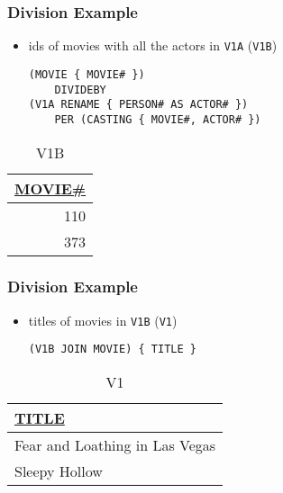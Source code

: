 \documentclass[dvipsnames]{beamer}
\theoremstyle{plain}
\begin{document}
\begin{frame}[fragile]
  \frametitle{Division Example}

  \begin{itemize}
    \item ids of movies with all the actors in \texttt{V1A}
      (\texttt{V1B})
    \begin{lstlisting}
(MOVIE { MOVIE# })
    DIVIDEBY
(V1A RENAME { PERSON# AS ACTOR# })
    PER (CASTING { MOVIE#, ACTOR# })
    \end{lstlisting}
  \end{itemize}

  \vspace{-10pt}
  \begin{tiny}
  \begin{table}
    \caption{V1B}
    \begin{tabular}{|r|}\hline
\underline{MOVIE\#}\\[2pt]\hline\hline
                110\\\hline
                373\\\hline
    \end{tabular}
  \end{table}
  \end{tiny}
\end{frame}

\begin{frame}[fragile]
  \frametitle{Division Example}

  \begin{itemize}
    \item titles of movies in \texttt{V1B} (\texttt{V1})
    \begin{lstlisting}
(V1B JOIN MOVIE) { TITLE }
    \end{lstlisting}
  \end{itemize}

  \vspace{-10pt}
  \begin{tiny}
  \begin{table}
    \caption{V1}
    \begin{tabular}{|l|}\hline
\underline{TITLE}             \\[2pt]\hline\hline
Fear and Loathing in Las Vegas\\\hline
Sleepy Hollow                 \\\hline
    \end{tabular}
  \end{table}
  \end{tiny}
\end{frame}
\end{document}
